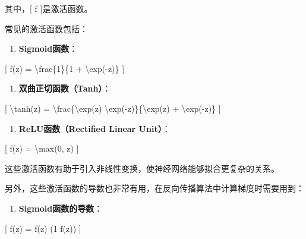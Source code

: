 其中，{[} f {]}是激活函数。

常见的激活函数包括：


\begin{enumerate}
\def\labelenumi{\arabic{enumi}.}
\item
  \textbf{Sigmoid函数}：
\end{enumerate}

{[} f(z) = \textbackslash frac\{1\}\{1 + \textbackslash exp(-z)\} {]}


\begin{enumerate}
\def\labelenumi{\arabic{enumi}.}
\item
  \textbf{双曲正切函数（Tanh）}：
\end{enumerate}

{[} \textbackslash tanh(z) = \textbackslash frac\{\textbackslash exp(z)
\textbackslash exp(-z)\}\{\textbackslash exp(z) +
\textbackslash exp(-z)\} {]}


\begin{enumerate}
\def\labelenumi{\arabic{enumi}.}
\item
  \textbf{ReLU函数（Rectified Linear Unit）}：
\end{enumerate}

{[} f(z) = \textbackslash max(0, z) {]}


这些激活函数有助于引入非线性变换，使神经网络能够拟合更复杂的关系。

另外，这些激活函数的导数也非常有用，在反向传播算法中计算梯度时需要用到：

\begin{enumerate}
\def\labelenumi{\arabic{enumi}.}
\item
  \textbf{Sigmoid函数的导数}：
\end{enumerate}

{[} f\textquotesingle(z) = f(z) (1 f(z)) {]}

